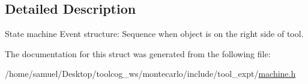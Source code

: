 \subsection{Detailed Description}
State machine Event structure\+: Sequence when object is on the right side of tool. 

The documentation for this struct was generated from the following file\+:\begin{DoxyCompactItemize}
\item 
/home/samuel/\+Desktop/toolcog\+\_\+ws/montecarlo/include/tool\+\_\+expt/\hyperlink{machine_8h}{machine.\+h}\end{DoxyCompactItemize}
